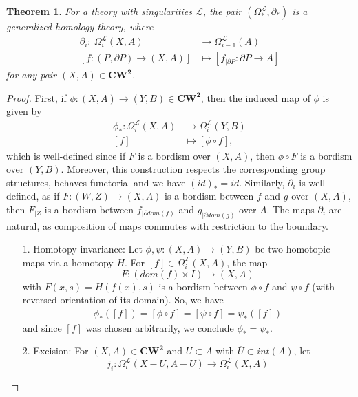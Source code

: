 \documentclass{scrreprt}
\newtheorem{theorem}[prop]{Theorem}
\begin{document}
\begin{theorem}
For a theory with singularities $\mathcal{L}$, the pair $(\Omega_*^{\mathcal{L}}, \partial_*)$ is a generalized homology theory, where 
\begin{align*}
\partial_i :\  \Omega_i^{\mathcal{L}}(X,A) &\to \Omega_{i-1}^{\mathcal{L}}(A) \\
[f: (P, \partial P) \to (X,A)] &\mapsto [f_{| \partial P}: \partial P \to A]
\end{align*}
for any pair $(X,A) \in \boldsymbol{CW^2}$.
\end{theorem}

\begin{proof}
First, if $\phi : (X,A) \to (Y,B) \in \boldsymbol{CW^2}$, then the induced map of $\phi $ is given by
\begin{align*}
\phi_* : \Omega_i^{\mathcal{L}}(X,A) &\to \Omega_i^{\mathcal{L}}(Y,B) \\
[f] &\mapsto [\phi \circ f],
\end{align*}
which is well-defined since if $F$ is a bordism over $(X,A)$, then $\phi \circ F$ is a bordism over $(Y,B)$. Moreover, this construction respects the corresponding group structures, behaves functorial and we have $(id)_*=id$. Similarly, $\partial_i$ is well-defined, as if $F:(W,Z) \to (X,A)$ is a bordism between $f$ and $g$ over $(X,A)$, then $F_{|Z}$ is a bordism between $f_{| \partial dom(f)}$ and $g_{| \partial dom(g)}$ over $A$. The maps $\partial_i$ are natural, as composition of maps commutes with restriction to the boundary. 
\begin{itemize}
\item[1.] Homotopy-invariance: Let $\phi, \psi : (X,A) \to (Y,B)$ be two homotopic maps via a homotopy $H$. For $[f] \in \Omega_i^{\mathcal{L}}(X,A)$, the map
\begin{equation*}
F: (dom(f) \times I) \to (X,A) 
\end{equation*}
with $F(x,s)=H(f(x),s)$ is a bordism between $\phi \circ f$ and $\psi \circ f$ (with reversed orientation of its domain). So, we have
\begin{align*}
\phi_* ([f]) = [\phi \circ f] = [\psi \circ f] = \psi_* ([f])
\end{align*}
and since $[f]$ was chosen arbitrarily, we conclude $\phi_*= \psi_*$.
\item[2.] Excision: For $(X,A) \in \boldsymbol{CW^2}$ and $U \subset A$ with $\overline{U} \subset int(A)$, let 
\begin{equation*}
j_i: \Omega_i^{\mathcal{L}}(X-U, A-U) \to \Omega_i^{\mathcal{L}}(X,A)

\end{equation*}
\end{itemize}
\end{proof}
\end{document}
